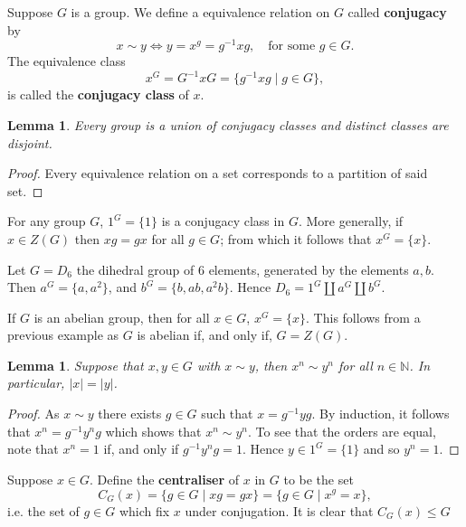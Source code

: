 \documentclass[11pt, notitlepage]{article}
\numberwithin{equation}{section}
\theoremstyle{plain}
\newtheorem{lemma}[theorem]{Lemma}
\theoremstyle{definition}
\newenvironment{example}
	{\pushQED{\qed}\renewcommand{\qedsymbol}{$\blacktriangleleft$}\examplex}
	{\popQED\endexamplex}
\newcommand{\N}{\mathbb{N}}
\begin{document}
Suppose $G$ is a group. We define a equivalence relation on $G$ called \textbf{conjugacy} by
\[
    x \sim y \iff y = x^g = g^{-1}xg, \quad \text{for some }g \in G.
\]
The equivalence class
\[
    x^G = G^{-1}xG = \{g^{-1}xg \mid g \in G\},
\]
is called the \textbf{conjugacy class} of $x$.

\begin{lemma}
Every group is a union of conjugacy classes and distinct classes are disjoint.
\end{lemma}

\begin{proof}
Every equivalence relation on a set corresponds to a partition of said set.
\end{proof}

\begin{example}
For any group $G$, $1^G = \{1\}$ is a conjugacy class in $G$. More generally, if $x \in Z(G)$ then $xg = gx$ for all $g \in G$; from which it follows that $x^G = \{x\}$.
\end{example}

\begin{example}
Let $G = D_6$ the dihedral group of 6 elements, generated by the elements $a,b$. Then $a^G = \{a,a^2\}$, and $b^G = \{b,ab,a^2b\}$. Hence $D_6 = 1^G \amalg a^G \amalg b^G$.
\end{example}

\begin{example}
If $G$ is an abelian group, then for all $x \in G$, $x^G = \{x\}$. This follows from a previous example as $G$ is abelian if, and only if, $G = Z(G)$.
\end{example}

\begin{lemma}
Suppose that $x,y \in G$ with $x \sim y$, then $x^n \sim y^n$ for all $n \in \N$. In particular, $|x| = |y|$.
\end{lemma}

\begin{proof}
As $x \sim y$ there exists $g \in G$ such that $x = g^{-1}yg$. By induction, it follows that $x^n = g^{-1}y^ng$ which shows that $x^n \sim y^n$. To see that the orders are equal, note that $x^n = 1$ if, and only if $g^{-1}y^n g = 1$. Hence $y \in 1^G = \{1\}$ and so $y^n = 1$.
\end{proof}

Suppose $x \in G$. Define the \textbf{centraliser} of $x$ in $G$ to be the set
\[
    C_G(x) = \{g \in G \mid xg = gx\} = \{g \in G \mid x^g = x\},
\]
i.e. the set of $g \in G$ which fix $x$ under conjugation. It is clear that $C_G(x) \le G$
\end{document}
